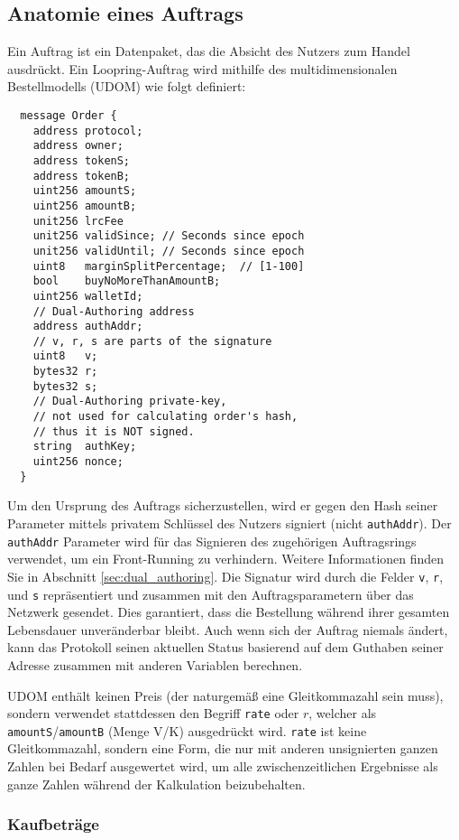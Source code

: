 \documentclass[UTF8,nofonts]{article}
\begin{document}
\begin{multicols}{2}
\subsection{Anatomie eines Auftrags\label{anatomy}}
Ein Auftrag ist ein Datenpaket, das die Absicht des Nutzers zum Handel ausdrückt. Ein Loopring-Auftrag wird mithilfe des multidimensionalen Bestellmodells (UDOM) wie folgt definiert:

\begin{verbatim}
  message Order {
    address protocol;
    address owner;
    address tokenS;
    address tokenB;
    uint256 amountS;
    uint256 amountB;
    unit256 lrcFee
    unit256 validSince; // Seconds since epoch
    unit256 validUntil; // Seconds since epoch
    uint8   marginSplitPercentage;  // [1-100]
    bool    buyNoMoreThanAmountB;
    uint256 walletId;
    // Dual-Authoring address
    address authAddr;
   	// v, r, s are parts of the signature
    uint8   v;       
    bytes32 r;
    bytes32 s;
    // Dual-Authoring private-key,
    // not used for calculating order's hash,
    // thus it is NOT signed.
    string  authKey;          
    uint256 nonce;
  }
\end{verbatim}

Um den Ursprung des Auftrags sicherzustellen, wird er gegen den Hash seiner Parameter mittels privatem Schlüssel des Nutzers signiert (nicht \verb|authAddr|). Der \verb|authAddr| Parameter wird für das Signieren des zugehörigen Auftragsrings verwendet, um ein Front-Running zu verhindern. Weitere Informationen finden Sie in Abschnitt \ref{sec:dual_authoring}. Die Signatur wird durch die Felder \verb|v|, \verb|r|, und \verb|s| repräsentiert und zusammen mit den Auftragsparametern über das Netzwerk gesendet. Dies garantiert, dass die Bestellung während ihrer gesamten Lebensdauer unveränderbar bleibt. Auch wenn sich der Auftrag niemals ändert, kann das Protokoll seinen aktuellen Status basierend auf dem Guthaben seiner Adresse zusammen mit anderen Variablen berechnen.

UDOM enthält keinen Preis (der naturgemäß eine Gleitkommazahl sein muss), sondern verwendet stattdessen den Begriff \verb|rate| oder $r$, welcher als \verb|amountS|/\verb|amountB| (Menge V/K) ausgedrückt wird. \verb|rate| ist keine Gleitkommazahl, sondern eine Form, die nur mit anderen unsignierten ganzen Zahlen bei Bedarf ausgewertet wird, um alle zwischenzeitlichen Ergebnisse als ganze Zahlen während der Kalkulation beizubehalten.

\subsubsection{Kaufbeträge}


\end{multicols}
\end{document}
